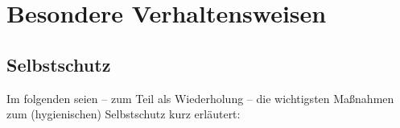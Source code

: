 \section{Besondere Verhaltensweisen}





\subsection{Selbstschutz}

Im folgenden seien -- zum Teil als Wiederholung -- die wichtigsten Maßnahmen
zum (hygienischen) Selbstschutz kurz erläutert:


